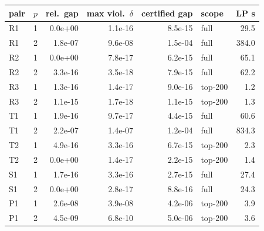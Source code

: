 \begin{tabular}{llrrrlr}
\toprule
pair & $p$ & rel.\ gap & max viol.\ $\delta$ & certified gap & scope & LP s \\
\midrule
R1 & 1 & 0.0e+00 & 1.1e-16 & 8.5e-15 & full & 29.5 \\
R1 & 2 & 1.8e-07 & 9.6e-08 & 1.5e-04 & full & 384.0 \\
R2 & 1 & 0.0e+00 & 7.8e-17 & 6.2e-15 & full & 65.1 \\
R2 & 2 & 3.3e-16 & 3.5e-18 & 7.9e-15 & full & 62.2 \\
R3 & 1 & 1.3e-16 & 1.4e-17 & 9.0e-16 & top-200 & 1.2 \\
R3 & 2 & 1.1e-15 & 1.7e-18 & 1.1e-15 & top-200 & 1.3 \\
T1 & 1 & 1.9e-16 & 9.7e-17 & 4.4e-15 & full & 60.6 \\
T1 & 2 & 2.2e-07 & 1.4e-07 & 1.2e-04 & full & 834.3 \\
T2 & 1 & 4.9e-16 & 3.3e-16 & 6.7e-15 & top-200 & 2.3 \\
T2 & 2 & 0.0e+00 & 1.4e-17 & 2.2e-15 & top-200 & 1.4 \\
S1 & 1 & 1.7e-16 & 3.3e-16 & 2.7e-15 & full & 27.4 \\
S1 & 2 & 0.0e+00 & 2.8e-17 & 8.8e-16 & full & 24.3 \\
P1 & 1 & 2.6e-08 & 3.9e-08 & 4.2e-06 & top-200 & 3.9 \\
P1 & 2 & 4.5e-09 & 6.8e-10 & 5.0e-06 & top-200 & 3.6 \\
\bottomrule
\end{tabular}
